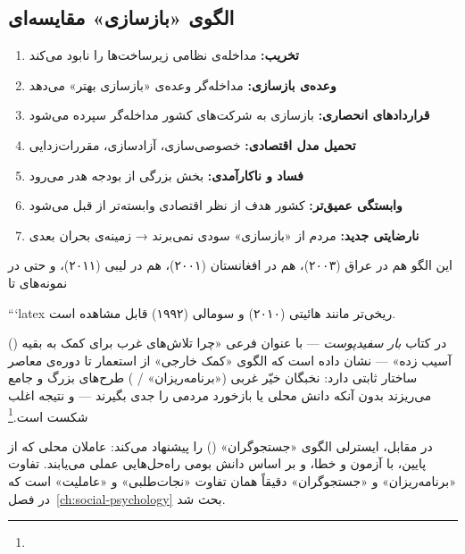 \subsection{الگوی «بازسازی» مقایسه‌ای}
\label{subsec:ch12-reconstruction-comparative}

\begin{tcolorbox}[wavebox, title={الگوی مشترک «بازسازی» پس از مداخله}]
\begin{enumerate}
\item \textbf{تخریب:} مداخله‌ی نظامی زیرساخت‌ها را نابود می‌کند
\item \textbf{وعده‌ی بازسازی:} مداخله‌گر وعده‌ی «بازسازی بهتر» می‌دهد
\item \textbf{قراردادهای انحصاری:} بازسازی به شرکت‌های کشور مداخله‌گر سپرده می‌شود
\item \textbf{تحمیل مدل اقتصادی:} خصوصی‌سازی، آزادسازی، مقررات‌زدایی
\item \textbf{فساد و ناکارآمدی:} بخش بزرگی از بودجه هدر می‌رود
\item \textbf{وابستگی عمیق‌تر:} کشور هدف از نظر اقتصادی وابسته‌تر از قبل می‌شود
\item \textbf{نارضایتی جدید:} مردم از «بازسازی» سودی نمی‌برند → زمینه‌ی بحران بعدی
\end{enumerate}

این الگو هم در عراق (۲۰۰۳)، هم در افغانستان (۲۰۰۱)، هم در لیبی (۲۰۱۱)، و حتی در نمونه‌های تا

```latex
ریخی‌تر مانند هائیتی (۲۰۱۰) و سومالی (۱۹۹۲) قابل مشاهده است.
\end{tcolorbox}

 () در کتاب \textit{بار سفیدپوست} — با عنوان فرعی «چرا تلاش‌های غرب برای کمک به بقیه آسیب زده» — نشان داده است که الگوی «کمک خارجی» از استعمار تا دوره‌ی معاصر ساختار ثابتی دارد: نخبگان خیّر غربی («برنامه‌ریزان» / ) طرح‌های بزرگ و جامع می‌ریزند بدون آنکه دانش محلی یا بازخورد مردمی را جدی بگیرند — و نتیجه اغلب شکست است.\footnote{}

در مقابل، ایسترلی الگوی «جستجوگران» () را پیشنهاد می‌کند: عاملان محلی که از پایین، با آزمون و خطا، و بر اساس دانش بومی راه‌حل‌هایی عملی می‌یابند. تفاوت «برنامه‌ریزان» و «جستجوگران» دقیقاً همان تفاوت «نجات‌طلبی» و «عاملیت» است که در فصل~\ref{ch:social-psychology} بحث شد.



